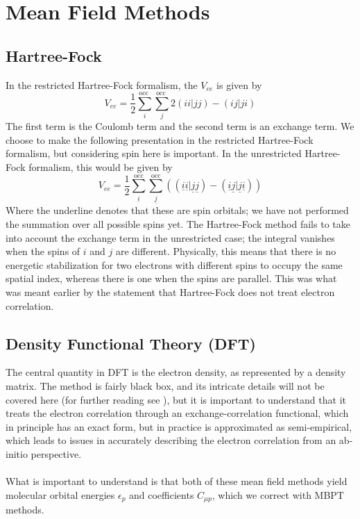 \documentclass[12pt]{caltech_thesis}
\begin{document}
\section{Mean Field Methods}
\subsection{Hartree-Fock}
In the restricted Hartree-Fock formalism, the $V_{ee}$ is given by
\begin{equation}
    V_{ee} = \frac{1}{2} \sum_i^{\text {occ }} \sum_j^{\text {occ }} 2(ii|jj) - (ij|ji)
\end{equation}
The first term is the Coulomb term and the second term is an exchange term. We choose to make the following presentation in the restricted Hartree-Fock formalism, but considering spin here is important. In the unrestricted Hartree-Fock formalism, this would be given by
\begin{equation}
    V_{ee} = \frac{1}{2} \sum_{\underline{i}}^{\text{occ}} \sum_{\underline{j}}^{\text{occ}} \left( (\underline{i}\underline{i}|\underline{j}\underline{j}) - (\underline{i}\underline{j}|\underline{j}\underline{i}) \right)
\end{equation}
Where the underline denotes that these are spin orbitals; we have not performed the summation over all possible spins yet. The Hartree-Fock method fails to take into account the exchange term in the unrestricted case; the integral vanishes when the spins of $i$ and $j$ are different. Physically, this means that there is no energetic stabilization for two electrons with different spins to occupy the same spatial index, whereas there is one when the spins are parallel. This was what was meant earlier by the statement that Hartree-Fock does not treat electron correlation.\autocite{szabo_modern_2012}
\subsection{Density Functional Theory (DFT)}
The central quantity in DFT is the electron density, as represented by a density matrix. The method is fairly black box, and its intricate details will not be covered here (for further reading see \textcite{bruneval_assessment_2019}), but it is important to understand that it treats the electron correlation through an exchange-correlation functional, which in principle has an exact form, but in practice is approximated as semi-empirical, which leads to issues in accurately describing the electron correlation from an ab-initio perspective.\\\\
What is important to understand is that both of these mean field methods yield molecular orbital energies $\epsilon_{p}$ and coefficients $C_{\mu p}$, which we correct with MBPT methods.
\end{document}
